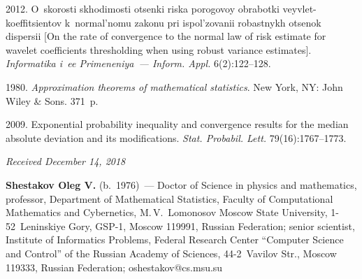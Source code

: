 \begin{multicols}{2}
{{\begin{thebibliography}{99}
 2012. O~skorosti skhodimosti otsenki riska porogovoy 
obrabotki veyvlet-koeffitsientov k~nor\-mal'\-no\-mu zakonu pri ispol'zovanii robastnykh 
otsenok dispersii [On the rate of convergence to the normal law of risk estimate for 
wavelet coefficients thresholding when using robust variance estimates]. 
\textit{Informatika i~ee Primeneniya~--- Inform. Appl.}  6(2):122--128.

 1980. \textit{Approximation theorems of mathematical statistics}.
New York, NY: John Wiley \& Sons. 371~p.

 2009. Exponential probability inequality 
and convergence results for the median absolute deviation and its modifications. 
\textit{Stat. Probabil. Lett.} 79(16):1767--1773.
\end{thebibliography}

 }
 }

\end{multicols}

\vspace*{-6pt}

\hfill{\small\textit{Received December 14, 2018}}



\Contrl

\noindent
\textbf{Shestakov Oleg V.} (b.\ 1976)~--- 
Doctor of Science in physics and mathematics, professor, Department of 
Mathematical Statistics, Faculty of Computational Mathematics and Cybernetics, 
M.\,V.~Lomonosov Moscow State University, 1-52~Leninskiye Gory, GSP-1, Moscow 119991, 
Russian Federation; senior scientist, Institute of Informatics Problems, 
Federal Research Center ``Computer Science and Control'' 
of the Russian Academy of Sciences, 44-2~Vavilov Str., Moscow 119333, 
Russian Federation; \mbox{oshestakov@cs.msu.su}
\label{end\stat}

\renewcommand{\bibname}{\protect\rm Литература} 
    